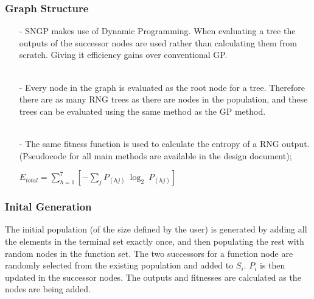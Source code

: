 \documentclass{beamer}
\begin{document}
\begin{frame}
\frametitle{Graph Structure}
\begin{itemize}
\item[-]SNGP makes use of Dynamic Programming. When evaluating a tree the outputs of the successor nodes are used rather than calculating them from scratch. Giving it efficiency gains over conventional GP.\\~\\
\item[-]Every node in the graph is evaluated as the root node for a tree. Therefore there are as many RNG trees as there are nodes in the population, and these trees can be evaluated using the same method as the GP method.\\~\\
\item[-]The same fitness function is used to calculate the entropy of a RNG output. (Pseudocode for all main methods are available in the design document);\\
 \begin{center}$E_{total} = \sum_{h = 1}^{7} \left[ - \sum_{j} P_{(hj)}\ \log_2\ P_{(hj)} \right]$\end{center}


\end{itemize}
\end{frame}

\begin{frame}
\frametitle{Inital Generation}
The initial population (of the size defined by the user) is generated by adding all the elements in the terminal set exactly once, and then populating the rest with random nodes in the function set. The two successors for a function node are randomly selected from the existing population and added to $S_i$. $P_i$ is then updated in the successor nodes. The outputs and fitnesses are calculated as the nodes are being added.
\end{frame}
\end{document}
